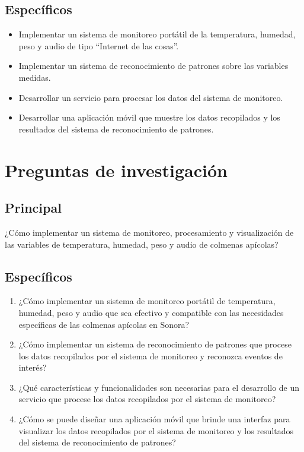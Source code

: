 \documentclass[journal]{IEEEtran} %
\begin{document}
\subsection{Específicos}
\begin{itemize}
    \item Implementar un sistema de monitoreo portátil de la temperatura, humedad, peso y audio de tipo “Internet de las cosas”.
    \item Implementar un sistema de reconocimiento de patrones sobre las variables medidas.
    \item Desarrollar un servicio para procesar los datos del sistema de monitoreo.
    \item Desarrollar una aplicación móvil que muestre los datos recopilados y los resultados del sistema de reconocimiento de patrones.
\end{itemize}

\section{Preguntas de investigación}
\subsection{Principal}
¿Cómo implementar un sistema de monitoreo, procesamiento y visualización de las variables de temperatura, humedad, peso y audio de colmenas apícolas?
\subsection{Específicos}
\begin{enumerate}
    \item ¿Cómo implementar un sistema de monitoreo portátil de temperatura, humedad, peso y audio que sea efectivo y compatible con las necesidades específicas de las colmenas apícolas en Sonora?
    \item ¿Cómo implementar un sistema de reconocimiento de patrones que procese los datos recopilados por el sistema de monitoreo y reconozca eventos de interés?
    \item ¿Qué características y funcionalidades son necesarias para el desarrollo de un servicio que procese los datos recopilados por el sistema de monitoreo?
    \item ¿Cómo se puede diseñar una aplicación móvil que brinde una interfaz para visualizar los datos recopilados por el sistema de monitoreo y los resultados del sistema de reconocimiento de patrones?
\end{enumerate}
\end{document}
